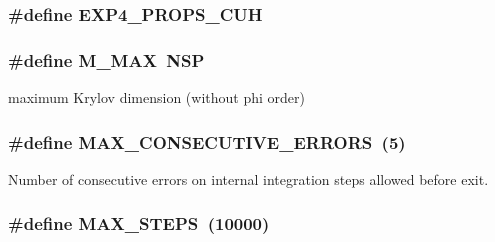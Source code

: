 \subsubsection[{\texorpdfstring{E\+X\+P4\+\_\+\+P\+R\+O\+P\+S\+\_\+\+C\+UH}{EXP4_PROPS_CUH}}]{\setlength{\rightskip}{0pt plus 5cm}\#define E\+X\+P4\+\_\+\+P\+R\+O\+P\+S\+\_\+\+C\+UH}\hypertarget{exp4__props_8cuh_a012706e43fb2a3e4102cae6222cccf91}{}\label{exp4__props_8cuh_a012706e43fb2a3e4102cae6222cccf91}
\subsubsection[{\texorpdfstring{M\+\_\+\+M\+AX}{M_MAX}}]{\setlength{\rightskip}{0pt plus 5cm}\#define M\+\_\+\+M\+AX~N\+SP}\hypertarget{exp4__props_8cuh_a61819141b0164a35f4d791b0e696721f}{}\label{exp4__props_8cuh_a61819141b0164a35f4d791b0e696721f}


maximum Krylov dimension (without phi order) 

\subsubsection[{\texorpdfstring{M\+A\+X\+\_\+\+C\+O\+N\+S\+E\+C\+U\+T\+I\+V\+E\+\_\+\+E\+R\+R\+O\+RS}{MAX_CONSECUTIVE_ERRORS}}]{\setlength{\rightskip}{0pt plus 5cm}\#define M\+A\+X\+\_\+\+C\+O\+N\+S\+E\+C\+U\+T\+I\+V\+E\+\_\+\+E\+R\+R\+O\+RS~(5)}\hypertarget{exp4__props_8cuh_a0f51553c710580b9899756f7ad472c93}{}\label{exp4__props_8cuh_a0f51553c710580b9899756f7ad472c93}


Number of consecutive errors on internal integration steps allowed before exit. 

\subsubsection[{\texorpdfstring{M\+A\+X\+\_\+\+S\+T\+E\+PS}{MAX_STEPS}}]{\setlength{\rightskip}{0pt plus 5cm}\#define M\+A\+X\+\_\+\+S\+T\+E\+PS~(10000)}\hypertarget{exp4__props_8cuh_aa0414caef00a64a51d4c6c0711d9e70a}{}\label{exp4__props_8cuh_aa0414caef00a64a51d4c6c0711d9e70a}



